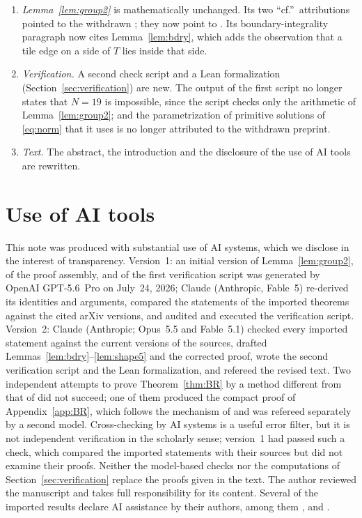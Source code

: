 \documentclass[11pt]{amsart}
\theoremstyle{remark}
\begin{document}
\begin{enumerate}
\item \emph{Lemma~\ref{lem:group2}} is mathematically unchanged. Its two ``cf.''\ attributions pointed to the withdrawn \cite{BeesonPrime}; they now point to \cite[Lemmas~13 and~14]{BR}. Its boundary-integrality paragraph now cites Lemma~\ref{lem:bdry}, which adds the observation that a tile edge on a side of $T$ lies inside that side.
\item \emph{Verification.} A second check script and a Lean formalization (Section~\ref{sec:verification}) are new. The output of the first script no longer states that $N=19$ is impossible, since the script checks only the arithmetic of Lemma~\ref{lem:group2}; and the parametrization of primitive solutions of \eqref{eq:norm} that it uses is no longer attributed to the withdrawn preprint.
\item \emph{Text.} The abstract, the introduction and the disclosure of the use of AI tools are rewritten.
\end{enumerate}

\section*{Use of AI tools}

This note was produced with substantial use of AI systems, which we disclose in the interest of transparency. Version~1: an initial version of Lemma~\ref{lem:group2}, of the proof assembly, and of the first verification script was generated by OpenAI GPT-5.6~Pro on July~24, 2026; Claude (Anthropic, Fable~5) re-derived its identities and arguments, compared the statements of the imported theorems against the cited arXiv versions, and audited and executed the verification script. Version~2: Claude (Anthropic; Opus~5.5 and Fable~5.1) checked every imported statement against the current versions of the sources, drafted Lemmas~\ref{lem:bdry}--\ref{lem:shape5} and the corrected proof, wrote the second verification script and the Lean formalization, and refereed the revised text. Two independent attempts to prove Theorem~\ref{thm:BR} by a method different from that of \cite{BR} did not succeed; one of them produced the compact proof of Appendix~\ref{app:BR}, which follows the mechanism of \cite{BR} and was refereed separately by a second model. Cross-checking by AI systems is a useful error filter, but it is not independent verification in the scholarly sense; version~1 had passed such a check, which compared the imported statements with their sources but did not examine their proofs. Neither the model-based checks nor the computations of Section~\ref{sec:verification} replace the proofs given in the text. The author reviewed the manuscript and takes full responsibility for its content. Several of the imported results declare AI assistance by their authors, among them \cite{Beeson2229}, \cite{BeesonIso} and \cite{BR}.
\end{document}
